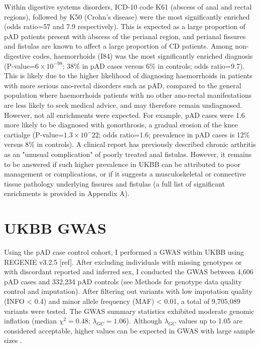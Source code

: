   Within digestive systems disorders, ICD-10 code K61 (abscess of anal and rectal regions), followed by K50 (Crohn's disease) were the most significantly enriched (odds ratio=57 and 7.9 respectively). This is expected as a large proportion of pAD patients present with abscess of the perianal region, and perianal fissures and fistulas are known to affect a large proportion of CD patients. Among non-digestive codes, haemorrhoids (I84) was the most significantly enriched diagnosis (P-value=$6\times10^{-98}$; 38\% in pAD cases versus 6\% in controls; odds ratio=9.7). This is likely due to the higher likelihood of diagnosing haemorrhoids in patients with more serious ano-rectal disorders such as pAD, compared to the general population where haemorrhoids patients with no other ano-rectal manifestations are less likely to seek medical advice, and may therefore remain undiagnosed. \\

However, not all enrichments were expected. For example, pAD cases were 1.6 more likely to be diagnosed with gonorthrosis, a gradual erosion of the knee cartialge (P-value=$1.3\times10^-22$; odds ratio=1.6; prevalence in pAD cases is 12\% versus 8\% in controls). A clinical report has previously described chronic arthritis as an "unusual complication" of poorly treated anal fistulas. However, it remains to be answered if such higher prevalence in UKBB can be attributed to poor management or complications, or if it suggests a musculoskeletal or connective tissue pathology underlying fissures and fistulas (a full list of significant enrichments is provided in Appendix A).





  \section{UKBB GWAS}
  Using the pAD case control cohort, I performed a GWAS within UKBB using REGENIE v3.2.5 [ref]. After excluding individuals with missing genotypes or with discordant reported and inferred sex, I conducted the GWAS between 4,606 pAD cases and 332,234 pAD controls (see Methods for genotype data quality control and imputation). After filtering out variants with low imputation quality (INFO < 0.4) and minor allele frequency (MAF) < 0.01, a total of 9,705,089 variants were tested. The GWAS summary statistics exhibited moderate genomic inflation (median $\chi^{2}=0.48$; $\lambda_{GC}=1.06$). Although $\lambda_{GC}$ values up to 1.05 are considered acceptable, higher values can be expected in GWAS with large sample sizes \cite{Price2010-zb}. 
  
